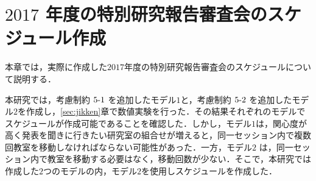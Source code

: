 \documentclass[a4paper,12pt,fleqn]{jarticle}
\begin{document}
\section{$2017$ 年度の特別研究報告審査会のスケジュール作成}
本章では，実際に作成した$2017$年度の特別研究報告審査会のスケジュールについて説明する．

本研究では，考慮制約 $5\mathchar`-1$ を追加したモデル$1$と，考慮制約 $5\mathchar`-2$ を追加したモデル$2$を作成し，\ref{sec:jikken}章で数値実験を行った．その結果それぞれのモデルでスケジュールが作成可能であることを確認した．しかし，モデル$1$は，関心度が高く発表を聞きに行きたい研究室の組合せが増えると，同一セッション内で複数回教室を移動しなければならない可能性があった．一方，モデル$2$ は，同一セッション内で教室を移動する必要はなく，移動回数が少ない．そこで，本研究では作成した$2$つのモデルの内，モデル$2$を使用しスケジュールを作成した．
\end{document}
